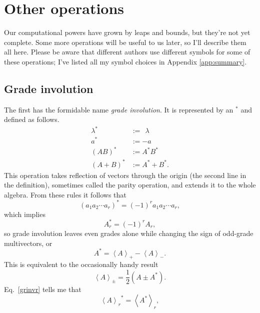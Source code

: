 \documentclass{utarticle}
\newcommand{\grinv}[2][]{\ensuremath{#2^{*#1}}}
\newcommand{\grade}[2][]{\ensuremath{\left\langle #2 \right\rangle_{#1}}}
\newcommand{\half}{\ensuremath{\frac{1}{2}}}
\begin{document}
\section{Other operations}
\label{otherops}

Our computational powers have grown by leaps and bounds, but they're not yet complete.
Some more operations will be useful to us later, so I'll describe them all here.  Please be
aware that different authors use different symbols for some of these operations; I've listed 
all my symbol choices in Appendix \ref{app:summary}.

\subsection{Grade involution}
\label{gradeinv}

The first has the formidable name \emph{grade involution}.  
It is represented by an \grinv{} and defined as follows.
\begin{align}
\grinv{\lambda} & := \ \ \lambda \nonumber \\
\grinv{a} & := -a \nonumber \\
\grinv{(AB)} & := \grinv{A} \grinv{B} \nonumber \\
\grinv{(A + B)} & := \grinv{A} + \grinv{B}.
\label{grinvrules} 
\end{align}
This operation takes reflection of vectors through the origin (the second line 
in the definition), sometimes called the parity operation, and extends it to the 
whole algebra.  From these rules it follows that
\begin{equation}
\grinv{(a_1 a_2 \dotsb a_r)} = (-1)^r a_1 a_2 \dotsb a_r,
\end{equation}
which implies 
\begin{equation} \grinv{A_r} = (-1)^r A_r, \label{grinvr} \end{equation}
so grade involution leaves even grades alone while changing the sign 
of odd-grade multivectors, or
\begin{equation} \grinv{A} = \grade[+]{A} - \grade[-]{A}.  \end{equation}
This is equivalent to the occasionally handy result
\begin{equation}
\grade[\pm]{A} = \half (A \pm \grinv{A}).
\label{evenoddfromgrinv}
\end{equation}
Eq.~\eqref{grinvr} tells me that
\begin{equation}
\grinv{\grade[r]{A}} = \grade[r]{\grinv{A}},
\end{equation}
\end{document}

